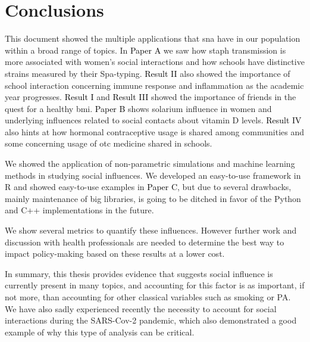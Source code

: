 \chapter{Conclusions}\label{ch:conclussions2}

This document showed the multiple applications that \gls{sna} have in our population within a broad range of topics. In \colorbox{PaperColor}{\textcolor{black}{Paper A}} we saw how \gls{staph} transmission is more associated with women's social interactions and how schools have distinctive strains measured by their Spa-typing. \colorbox{ResultColor}{\textcolor{black}{Result II}} also showed the importance of school interaction concerning immune response and inflammation as the academic year progresses. \colorbox{ResultColor}{\textcolor{black}{Result I}} and \colorbox{ResultColor}{\textcolor{black}{Result III}} showed the importance of friends in the quest for a healthy \gls{bmi}. \colorbox{PaperColor}{\textcolor{black}{Paper B}} shows solarium influence in women and underlying influences related to social contacts about vitamin D levels. \colorbox{ResultColor}{\textcolor{black}{Result IV}} also hints at how hormonal contraceptive usage is shared among communities and some concerning usage of \gls{otc} medicine shared in schools.

We showed the application of non-parametric simulations and machine learning methods in studying social influences. We developed an easy-to-use framework in R and showed easy-to-use examples in  \colorbox{PaperColor}{\textcolor{black}{Paper C}}, but due to several drawbacks, mainly maintenance of big libraries, is going to be ditched in favor of the Python and C++ implementations in the future.

We show several metrics to quantify these influences. However further work and discussion with health professionals are needed to determine the best way to impact policy-making based on these results at a lower cost.

In summary, this thesis provides evidence that suggests social influence is currently present in many topics, and accounting for this factor is as important, if not more, than accounting for other classical variables such as smoking or PA. We have also sadly experienced recently the necessity to account for social interactions during the SARS-Cov-2 pandemic, which also demonstrated a good example of why this type of analysis can be critical.